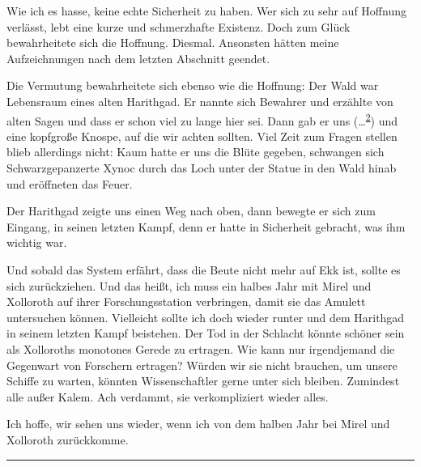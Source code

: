 \documentclass[11pt]{article}
\begin{document}
Wie ich es hasse, keine echte Sicherheit zu haben. Wer sich zu sehr auf
Hoffnung verlässt, lebt eine kurze und schmerzhafte Existenz. Doch zum
Glück bewahrheitete sich die Hoffnung. Diesmal. Ansonsten hätten meine
Aufzeichnungen nach dem letzten Abschnitt geendet.

Die Vermutung bewahrheitete sich ebenso wie die Hoffnung: Der Wald war
Lebensraum eines alten Harithgad. Er nannte sich Bewahrer und erzählte
von alten Sagen und dass er schon viel zu lange hier sei. Dann gab er
uns
(\ldots{}\textsuperscript{\href{http://1w6.org/print/book/export/html/59\#fn:1}{2}})
und eine kopfgroße Knospe, auf die wir achten sollten. Viel Zeit zum
Fragen stellen blieb allerdings nicht: Kaum hatte er uns die Blüte
gegeben, schwangen sich Schwarzgepanzerte Xynoc durch das Loch unter der
Statue in den Wald hinab und eröffneten das Feuer.

Der Harithgad zeigte uns einen Weg nach oben, dann bewegte er sich zum
Eingang, in seinen letzten Kampf, denn er hatte in Sicherheit gebracht,
was ihm wichtig war.

Und sobald das System erfährt, dass die Beute nicht mehr auf Ekk ist,
sollte es sich zurückziehen. Und das heißt, ich muss ein halbes Jahr mit
Mirel und Xolloroth auf ihrer Forschungsstation verbringen, damit sie
das Amulett untersuchen können. Vielleicht sollte ich doch wieder runter
und dem Harithgad in seinem letzten Kampf beistehen. Der Tod in der
Schlacht könnte schöner sein als Xolloroths monotones Gerede zu
ertragen. Wie kann nur irgendjemand die Gegenwart von Forschern
ertragen? Würden wir sie nicht brauchen, um unsere Schiffe zu warten,
könnten Wissenschaftler gerne unter sich bleiben. Zumindest alle außer
Kalem. Ach verdammt, sie verkompliziert wieder alles.

Ich hoffe, wir sehen uns wieder, wenn ich von dem halben Jahr bei Mirel
und Xolloroth zurückkomme.

\begin{center}\rule{3in}{0.4pt}\end{center}
\end{document}

